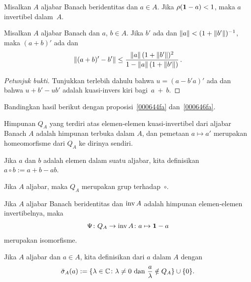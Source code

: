 \begin{prop} Misalkan $A$ aljabar Banach beridentitas dan $a \in A$. Jika $\rho(\mathbf{1} - a) < 1$, maka
$a$ invertibel dalam~$A$.
\end{prop}

\begin{prop} Misalkan $A$ aljabar Banach dan $a$, $b \in A$. Jika $b'$ ada dan
$\lVert a\rVert < (1 + \lVert b'\rVert)^{-1}$, maka $(a + b)'$ ada dan
  \[ \lVert(a + b)' - b'\rVert
           \le \frac{\lVert a\rVert\,(1 + \lVert b'\rVert)^2}{1 - \lVert a\rVert\,(1 + \lVert b'\rVert)}\,.\]
\end{prop}
 \begin{proof}[\emph{Petunjuk bukti}] Tunjukkan terlebih dahulu bahwa $u = (a - b'a)'$ ada dan bahwa
 $u + b' - ub'$ adalah kuasi-invers kiri bagi~$a~+~b$. \ns
\end{proof}

Bandingkan hasil berikut dengan proposisi~\ref{000644fa} dan~\ref{000646fa}.
\begin{prop} Himpunan $Q_A$ yang terdiri atas
elemen-elemen kuasi-invertibel dari aljabar Banach $A$ adalah himpunan terbuka dalam $A$, dan pemetaan $a \mapsto
a'$ merupakan homeomorfisme dari $Q_A$ ke dirinya sendiri.
\end{prop}

\begin{notn} Jika $a$ dan $b$ adalah elemen dalam suatu aljabar, kita definisikan
$a \circ b := a + b - ab$.
\end{notn}

\begin{prop} Jika $A$ aljabar, maka $Q_A$ merupakan grup terhadap~$\circ$.
\end{prop}

\begin{prop} Jika $A$ aljabar Banach beridentitas dan $\operatorname{inv} A$ adalah himpunan elemen-elemen
invertibelnya, maka
   \[ \Psi\colon Q_A \rightarrow \operatorname{inv} A\colon  a \mapsto \mathbf{1} - a \]
merupakan isomorfisme.
\end{prop}

\begin{defn} Jika $A$ aljabar dan $a \in A$, kita definisikan
 dari $a$ dalam $A$ dengan
  \[ \breve{\sigma}_A(a) := \{\lambda \in \mathbb{C}\colon  \lambda \ne 0
                      \text{ dan } \dfrac a\lambda \notin Q_A\}\cup\{0\}. \]
\end{defn}

